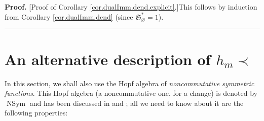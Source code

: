 \documentclass
[numbers=enddot,12pt,final,onecolumn,notitlepage,abstracton]{scrartcl}%
\theoremstyle{definition}
\newenvironment{proof}[1][Proof]{\noindent\textbf{#1.} }{\ \rule{0.5em}{0.5em}}
\newenvironment{vershort}{}{}
\begin{document}
\begin{vershort}
\begin{proof}
[Proof of Corollary \ref{cor.dualImm.dend.explicit}.]This follows by induction
from Corollary \ref{cor.dualImm.dend} (since $\mathfrak{S}_{\varnothing}%
^{\ast}=1$).
\end{proof}
\end{vershort}

\section{\label{sect.zabrocki}An alternative description of $h_{m}\left.
\prec\right.  $}

In this section, we shall also use the Hopf algebra of \textit{noncommutative
symmetric functions}. This Hopf algebra (a noncommutative one, for a change)
is denoted by $\operatorname*{NSym}$ and has been discussed in \cite[Section
5.4]{Reiner} and \cite[Chapter 6]{HGK}; all we need to know about it are the
following properties:
\end{document}
